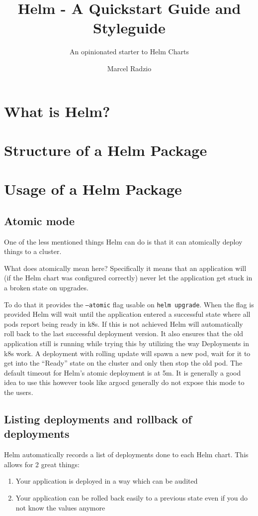 \documentclass[english,10pt,a4paper]{scrreprt}
\title{Helm - A Quickstart Guide and Styleguide}
\subtitle{An opinionated starter to Helm Charts}
\author{Marcel Radzio}
\begin{document}
\maketitle
\tableofcontents

\chapter{What is Helm?}


\chapter{Structure of a Helm Package}


\chapter{Usage of a Helm Package}

\section{Atomic mode}
One of the less mentioned things Helm can do is that it can atomically deploy things to a cluster.

What does atomically mean here?
Specifically it means that an application will (if the Helm chart was configured correctly) never let the application get stuck in a broken state on upgrades.

To do that it provides the \texttt{--atomic} flag usable on \texttt{helm upgrade}.
When the flag is provided Helm will wait until the application entered a successful state where all pods report being ready in \Gls{k8s}.
If this is not achieved Helm will automatically roll back to the last successful deployment version.
It also ensures that the old application still is running while trying this by utilizing the way Deployments in \Gls{k8s} work.
A deployment with rolling update will spawn a new pod, wait for it to get into the \enquote{Ready} state on the cluster and only then stop the old pod.
The default timeout for Helm's atomic deployment is at 5m.
It is generally a good idea to use this however tools like argocd generally do not expose this mode to the users.

\section{Listing deployments and rollback of deployments}
Helm automatically records a list of deployments done to each Helm chart.
This allows for 2 great things:
\begin{enumerate}
  \item Your application is deployed in a way which can be audited
  \item Your application can be rolled back easily to a previous state even if you do not know the values anymore
\end{enumerate}
\end{document}
